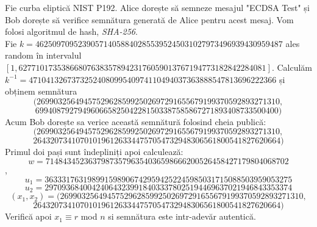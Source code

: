 \begin{ex}
Fie curba eliptică NIST P192. Alice dorește să semneze mesajul "ECDSA Test" și Bob dorește să verifice semnătura generată de Alice pentru acest mesaj. Vom folosi algoritmul de hash, \textit{SHA-256}. \\
Fie  $k= 4625097095239057140588402855395245031027973496939430959487$ ales random în intervalul $[1,6277101735386680763835789423176059013767194773182842284081]$.
Calculăm $k^{-1} = 4710413267373252408099540974110494037363888547813696222366$ și obținem semnătura 
$$(269903256494575296285992502697291655679199370592893271310,$$ $$699408792794960665825042281503387585867271893408733500400)$$
Acum Bob dorește sa verice această semnătură folosind cheia publică:
$$ (269903256494575296285992502697291655679199370592893271310, $$ $$2643207341070101961263344757054732948306561800541827620664)$$
Primul doi pași sunt îndepliniți apoi calculează: 
$$w = 714843452363798735796354036598666200526458427179804068702$$, 
$$ u_1 = 3633317631989915989067429594252245985031715088503959053275$$
$$ u_2 = 2970936840042406432399184033378025194469637021946843353374 $$
$$(x_1, x_2) = (269903256494575296285992502697291655679199370592893271310,$$ $$2643207341070101961263344757054732948306561800541827620664)$$
Verifică apoi $x_1 \equiv r$ mod $n$ si semnătura este intr-adevăr autentică.
\end{ex}



